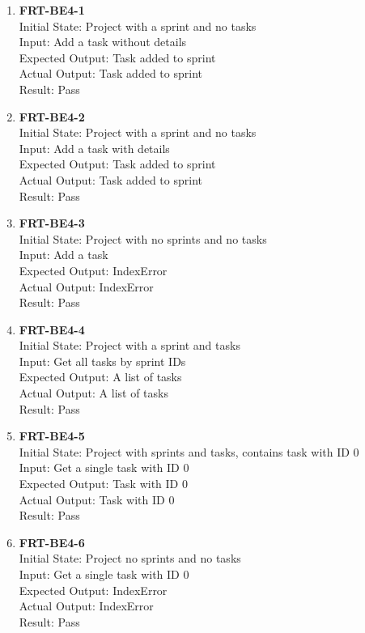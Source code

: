 \documentclass[12pt, titlepage]{article}
\begin{document}
\begin{enumerate}
    \item{\textbf{FRT-BE4-1}}\\
    Initial State: Project with a sprint and no tasks\\
    Input: Add a task without details\\
    Expected Output: Task added to sprint\\
    Actual Output: Task added to sprint\\
    Result: Pass

    \item{\textbf{FRT-BE4-2}}\\
    Initial State: Project with a sprint and no tasks\\
    Input: Add a task with details\\
    Expected Output: Task added to sprint\\
    Actual Output: Task added to sprint\\
    Result: Pass
    
    \item{\textbf{FRT-BE4-3}}\\
    Initial State: Project with no sprints and no tasks \\
    Input: Add a task\\
    Expected Output: IndexError\\
    Actual Output: IndexError\\
    Result: Pass
    
    \item{\textbf{FRT-BE4-4}}\\
    Initial State: Project with a sprint and tasks \\
    Input: Get all tasks by sprint IDs\\
    Expected Output: A list of tasks\\
    Actual Output: A list of tasks\\
    Result: Pass
    
    \item{\textbf{FRT-BE4-5}}\\
    Initial State: Project with sprints and tasks, contains task with ID 0 \\
    Input: Get a single task with ID 0\\
    Expected Output: Task with ID 0\\
    Actual Output: Task with ID 0\\
    Result: Pass
    
    \item{\textbf{FRT-BE4-6}}\\
    Initial State: Project no sprints and no tasks\\
    Input: Get a single task with ID 0\\
    Expected Output: IndexError\\
    Actual Output: IndexError\\
    Result: Pass
    

\end{enumerate}
\end{document}
